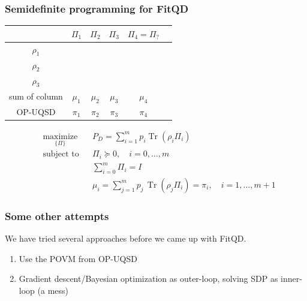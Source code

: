 \documentclass{beamer}
\begin{document}
\begin{frame}
    \frametitle{Semidefinite programming for FitQD}
    \begin{table}[ht]
        \begin{tabular}{c | c | c | c | c | c}
                          & $\Pi_{1}$            & $\Pi_{2}$            & $\Pi_{3}$            & $\Pi_{4} = \Pi_{?}$   \\
            \hline
            $\rho_{1}$    & \cellcolor{green!20} & \cellcolor{red!20}   & \cellcolor{red!20}   & \cellcolor{yellow!30} \\
            $\rho_{2}$    & \cellcolor{red!20}   & \cellcolor{green!20} & \cellcolor{red!20}   & \cellcolor{yellow!30} \\
            $\rho_{3}$    & \cellcolor{red!20}   & \cellcolor{red!20}   & \cellcolor{green!20} & \cellcolor{yellow!30} \\
            \hline
            sum of column & $\mu_{1}$            & $\mu_{2}$            & $\mu_{3}$            & $\mu_{4}$             \\
            OP-UQSD       & $\pi_{1}$            & $\pi_{2}$            & $\pi_{3}$            & $\pi_{4}$
        \end{tabular}
    \end{table}
    {
    \scriptsize
    \begin{align}
         & \underset{\{\Pi\}}{\text{maximize}} &  & P_{D}=\sum_{i=1}^{m} p_{i} \operatorname{Tr}(\rho_{i} \Pi_{i})                                      \\
         & \text{subject to}                   &  & \Pi_{i} \succeq 0, \quad i = 0, \ldots, m                                                           \\
         &                                     &  & \sum_{i=0}^{m} \Pi_i = I                                                                            \\
         &                                     &  & \mu_{i} = \sum_{j=1}^{m} p_j \, \operatorname{Tr}(\rho_j \Pi_i) = \pi_{i}, \quad i = 1, \ldots, m+1
    \end{align}
    }
\end{frame}

\begin{frame}
    \frametitle{Some other attempts}
    We have tried several approaches before we came up with FitQD.
    \begin{enumerate}
        \item Use the POVM from OP-UQSD
        \item Gradient descent/Bayesian optimization as outer-loop, solving SDP as inner-loop (a mess)
    \end{enumerate}
    
    \vspace{0.1cm}
    \centering
    \scalebox{0.4}{}
\end{frame}
\end{document}
